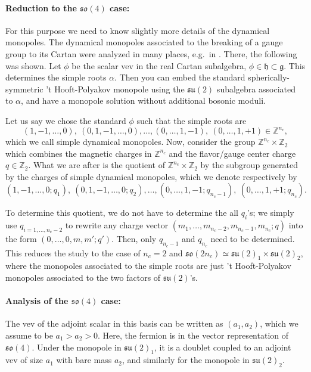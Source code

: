 \documentclass[12pt]{article}
\numberwithin{equation}{section}
\def\bZ{\mathbb{Z}}
\def\su{\mathfrak{su}}
\def\so{\mathfrak{so}}
\begin{document}
\paragraph{Reduction to  the $\so(4)$ case:}
For this purpose we need to know slightly more details of the dynamical monopoles.
The dynamical monopoles associated to the breaking of a gauge group to its Cartan were analyzed in many places, 
e.g.~in \cite{Weinberg:1979zt}.
There, the following was shown.
Let $\phi$ be the scalar vev in the real Cartan subalgebra, $\phi\in \mathfrak{h}\subset \mathfrak{g}$.
This determines the simple roots $\alpha$.
Then you can embed the standard spherically-symmetric 't Hooft-Polyakov monopole
using the $\mathfrak{su}(2)$ subalgebra associated to $\alpha$,
and have a monopole solution without additional bosonic moduli. 

Let us say we chose the standard $\phi$ such that the simple roots are 
\begin{equation}
(1,-1,\ldots,0),\ 
(0,1,-1,\ldots,0),\ldots,
(0,\ldots,1,-1),\ 
(0,\ldots,1,+1)\in \bZ^{n_c},
\end{equation}
which we call simple dynamical monopoles.
Now, consider the group $\bZ^{n_c}\times \bZ_2$ which combines the magnetic charges in $\bZ^{n_c}$ and the flavor/gauge center charge $q \in \bZ_2$.
What we are after is the quotient of $\bZ^{n_c}\times \bZ_2$ 
by the subgroup generated by the charges of simple dynamical monopoles,
which we denote respectively by
\begin{equation}
(1,-1,\ldots,0;q_1),\ 
(0,1,-1,\ldots,0;q_2),\ldots,
(0,\ldots,1,-1;q_{n_c-1}),\ 
(0,\ldots,1,+1;q_{n_c}).
\end{equation}

To determine this quotient,
we do not have to determine the all $q_i$'s; 
we simply use $q_{i=1,\ldots, n_c-2}$ to rewrite any charge vector $
(m_1,\ldots, m_{n_c-2}, m_{n_c-1},m_{n_c}; q)
$
into the form $
(0,\ldots,0, m, m' ; q').
$
Then, only $q_{n_c-1}$ and $q_{n_c}$ need to be determined.
This reduces the study to the case of $n_c=2$ and $\so(2n_c)\simeq \su(2)_1 \times \su(2)_2$,
where the monopoles associated to the simple roots are just 't Hooft-Polyakov monopoles associated to the two factors of $\su(2)$'s.

\paragraph{Analysis of the $\so(4)$ case:}

The vev of the adjoint scalar in this basis can be written as $(a_1,a_2)$, which we assume to be $a_1>a_2>0$.
Here, the fermion is in the vector representation of $\so(4)$.
Under the monopole in $\su(2)_1$, it is a doublet coupled to an adjoint vev of size $a_1$ with bare mass $a_2$,
and similarly for the monopole in $\su(2)_2$.
\end{document}
